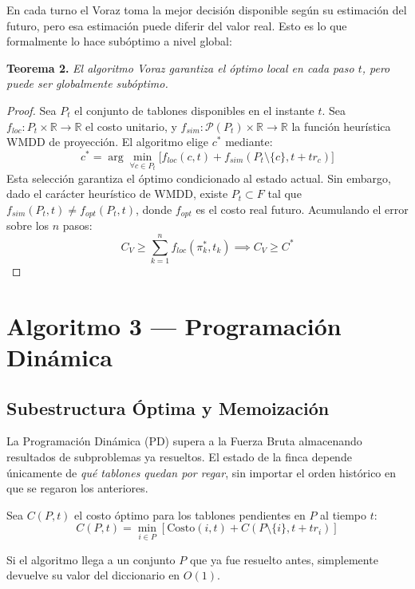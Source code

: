 \documentclass[conference, a4paper]{IEEEtran}
\begin{document}
En cada turno el Voraz toma la mejor decisión disponible según su estimación del futuro, pero esa estimación puede diferir del valor real. Esto es lo que formalmente lo hace subóptimo a nivel global:

\textbf{Teorema 2.} \textit{El algoritmo Voraz garantiza el óptimo local en cada paso $t$, pero puede ser globalmente subóptimo.}

\begin{proof}
Sea $P_t$ el conjunto de tablones disponibles en el instante $t$. Sea $f_{loc}: P_t \times \mathbb{R} \to \mathbb{R}$ el costo unitario, y $f_{sim}: \mathcal{P}(P_t) \times \mathbb{R} \to \mathbb{R}$ la función heurística WMDD de proyección.
El algoritmo elige $c^*$ mediante:
\begin{equation}
c^* = \arg\min_{\forall c \in P_t} \Big[ f_{loc}(c, t) + f_{sim}(P_t \setminus \{c\}, t + tr_c) \Big]
\end{equation}
Esta selección garantiza el óptimo condicionado al estado actual. Sin embargo, dado el carácter heurístico de WMDD, existe $P_t \subset F$ tal que $f_{sim}(P_t, t) \neq f_{opt}(P_t, t)$, donde $f_{opt}$ es el costo real futuro.
Acumulando el error sobre los $n$ pasos:
\begin{equation}
C_V \ge \sum_{k=1}^n f_{loc}(\pi_k^*, t_k) \implies C_V \ge C^*
\end{equation}
\end{proof}

\section{Algoritmo 3 — Programación Dinámica}
\subsection{Subestructura Óptima y Memoización}
La Programación Dinámica (PD) supera a la Fuerza Bruta almacenando resultados de subproblemas ya resueltos. El estado de la finca depende únicamente de \textit{qué tablones quedan por regar}, sin importar el orden histórico en que se regaron los anteriores.

Sea $C(P, t)$ el costo óptimo para los tablones pendientes en $P$ al tiempo $t$:
\begin{equation}
C(P, t) = \min_{i \in P} \left[ \text{Costo}(i, t) + C(P \setminus \{i\}, t + tr_i) \right]
\end{equation}

Si el algoritmo llega a un conjunto $P$ que ya fue resuelto antes, simplemente devuelve su valor del diccionario en $O(1)$.
\end{document}
